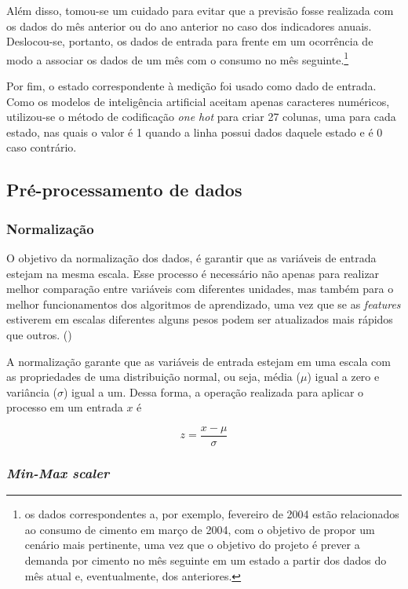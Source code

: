 Além disso, tomou-se um cuidado para evitar que a previsão fosse 
realizada com os dados do mês anterior ou do ano anterior no caso dos
indicadores anuais. Deslocou-se, portanto, os dados de entrada 
para frente em um ocorrência de modo a associar os dados de um 
mês com o consumo no mês seguinte.\footnote{os dados correspondentes 
a, por exemplo, fevereiro de 2004 estão relacionados ao consumo de 
cimento em março de 2004, com o objetivo de propor um cenário mais pertinente, 
uma vez que o objetivo do projeto é prever a demanda por cimento no mês seguinte 
em um estado a partir dos dados do mês atual e, eventualmente, dos anteriores.
}

Por fim, o estado correspondente à medição foi usado como dado de entrada. 
Como os modelos de inteligência artificial aceitam apenas caracteres numéricos,
utilizou-se o método de codificação \textit{one hot} para criar 27 colunas, uma
para cada estado, nas quais o valor é 1 quando a linha possui dados daquele estado 
e é 0 caso contrário.


\subsection{Pré-processamento de dados}
\label{sec:norm_dados}


\subsubsection{Normalização}



O objetivo da normalização dos dados, é garantir que as variáveis de entrada 
estejam na mesma escala. Esse processo é necessário não apenas para realizar melhor comparação entre variáveis 
com diferentes unidades, mas também para o melhor funcionamentos dos algoritmos 
de aprendizado, uma vez que se as \textit{features} estiverem em escalas diferentes
alguns pesos podem ser atualizados mais rápidos que outros. (\cite{Raschka})


A normalização garante que as variáveis de entrada estejam em uma 
escala com as propriedades de uma distribuição normal, ou seja, média ($\mu$)
igual a zero e variância ($\sigma$) igual a um. Dessa forma, a operação 
realizada para aplicar o processo em um entrada $x$ é

\begin{equation}
  z = \frac{x - \mu}{\sigma}
\end{equation}

\subsubsection{\textit{Min-Max scaler}}

